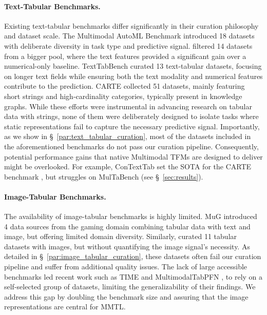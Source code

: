 \documentclass{article}
\begin{document}
\paragraph{Text-Tabular Benchmarks.} Existing text-tabular benchmarks differ significantly in their curation philosophy and dataset scale. The Multimodal AutoML Benchmark \cite{shi_benchmarking_2021} introduced 18 datasets with deliberate diversity in task type and predictive signal. \citet{grinsztajn_vectorizing_2023} filtered 14 datasets from a bigger pool, where the text features provided a significant gain over a numerical-only baseline. TextTabBench \cite{mraz_towards_2025} curated 13 text-tabular datasets, focusing on longer text fields while ensuring both the text modality and numerical features contribute to the prediction. CARTE \citep{kim_carte_2024} collected 51 datasets, mainly featuring short strings and high-cardinality categories, typically present in knowledge graphs. While these efforts were instrumental in advancing research on tabular data with strings, none of them were deliberately designed to isolate tasks where static representations fail to capture the necessary predictive signal. Importantly, as we show in \S~\ref{par:text_tabular_curation}, most of the datasets included in the aforementioned benchmarks do not pass our curation pipeline. Consequently, potential performance gains that native Multimodal TFMs are designed to deliver might be overlooked. For example, ConTextTab set the SOTA for the CARTE benchmark \cite{spinaci_contexttab_2025}, but struggles on MulTaBench (see \S~\ref{sec:results}).


\paragraph{Image-Tabular Benchmarks.} The availability of image-tabular benchmarks is highly limited. MuG \citep{lu_mug_2023} introduced 4 data sources from the gaming domain combining tabular data with text and image, but offering limited domain diversity. Similarly, \citet{tang_bag_2024} curated 11 tabular datasets with images, but without quantifying the image signal's necessity. As detailed in \S~\ref{par:image_tabular_curation}, these datasets often fail our curation pipeline and suffer from additional quality issues. The lack of large accessible benchmarks led recent work such as TIME \cite{luo_time_2025} and MultimodalTabPFN \cite{kim_multimodalpfn_2025}, to rely on a self-selected group of datasets, limiting the generalizability of their findings. We address this gap by doubling the benchmark size and assuring that the image representations are central for MMTL.
\end{document}
